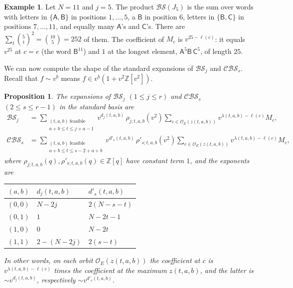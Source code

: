 \documentclass[11pt,a4paper,reqno]{amsart}
\numberwithin{equation}{section}
\newtheorem{proposition}[theorem]{Proposition}
\theoremstyle{definition}
\newtheorem{example}[theorem]{Example}
\theoremstyle{remark}
\theoremstyle{plain}
\newcommand{\A}{\mathsf A}
\newcommand{\B}{\mathsf B}
\newcommand{\CC}{\mathsf C}
\newcommand{\D}{\mathcal {BS}}
\newcommand{\R}{\mathcal {BS}}
\newcommand{\V}{\mathcal {CBS}}
\begin{document}
\begin{example}\label{ex:initial-N11}
Let $N=11$ and $j=5$. The product $\D(J_5)$ is the sum over words with letters in $\{\A,\B\}$ in positions $1,\ldots,5$,
a $\B$ in position $6$, letters in $\{\B,\CC\}$ in positions $7,\ldots,11$, and equally many $\A$'s and $\CC$'s. There are
$\sum_t\binom5t^2=\binom{10}5=252$ of them. The coefficient of $M_c$ is $v^{25-\ell(c)}$: it equals $v^{25}$ at $c=e$ (the word
$\B^{11}$) and $1$ at the longest element, $\A^5\B\,\CC^5$, of length $25$.
\end{example}

We can now compute the shape of the standard expansions of $\R_j$ and $\V_s$. Recall that $f\sim v^b$ means $f\in v^b(1+v^2\mathbb Z[v^2])$.

\begin{proposition}\label{prop:lowesttable}
The expansions of $\R_j$ $(1\leq j\leq r)$ and $\V_s$ $(2\leq s\leq r-1)$ in the standard basis are
\begin{align}
 \R_j&=\sum_{\substack{(t,a,b)\ \mathrm{feasible}\\a+b\leq t\leq j+a-1}}
 v^{d_j(t,a,b)}\,\rho_{j;t,a,b}(v^2)
 \sum_{c\in\mathcal O_E(z(t,a,b))}v^{\lambda(t,a,b)-\ell(c)}M_c,\label{eq:R-standard-expansion}\\
 \V_s&=\sum_{\substack{(t,a,b)\ \mathrm{feasible}\\a+b\leq t\leq s-2+a+b}}
 v^{d'_s(t,a,b)}\,\rho'_{s;t,a,b}(v^2)
 \sum_{c\in\mathcal O_E(z(t,a,b))}v^{\lambda(t,a,b)-\ell(c)}M_c,\label{eq:V-standard-expansion}
\end{align}
where $\rho_{j;t,a,b}(q),\rho'_{s;t,a,b}(q)\in\mathbb Z[q]$ have constant term $1$, and the exponents are
\begin{center}
\begin{tabular}{@{}cll@{}}
\toprule
$(a,b)$ &\quad  $d_j(t,a,b)$ \quad  & $d'_s(t,a,b)$\\\midrule
$(0,0)$ & $N-2j$ & $2(N-s-t)$\\
$(0,1)$ & $1$ & $N-2t-1$\\
$(1,0)$ & $0$ & $N-2t$\\
$(1,1)$ & $2-(N-2j)$ & $2(s-t)$\\\bottomrule
\end{tabular}
\end{center}
In other words, on each orbit $\mathcal O_E(z(t,a,b))$ the coefficient at $c$ is $v^{\lambda(t,a,b)-\ell(c)}$ times the coefficient at the maximum $z(t,a,b)$, and the latter is $\sim v^{d_j(t,a,b)}$, respectively $\sim v^{d'_s(t,a,b)}$.
\end{proposition}
\end{document}
